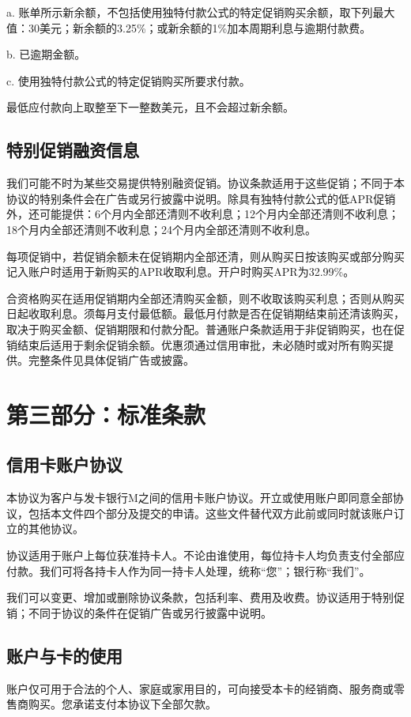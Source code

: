 \documentclass[UTF8,fontset=none,11pt,a4paper]{ctexart}
\begin{document}
a. 账单所示新余额，不包括使用独特付款公式的特定促销购买余额，取下列最大值：30美元；新余额的3.25\%；或新余额的1\%加本周期利息与逾期付款费。


b. 已逾期金额。


c. 使用独特付款公式的特定促销购买所要求付款。


最低应付款向上取整至下一整数美元，且不会超过新余额。


\subsection*{特别促销融资信息}
我们可能不时为某些交易提供特别融资促销。协议条款适用于这些促销；不同于本协议的特别条件会在广告或另行披露中说明。除具有独特付款公式的低APR促销外，还可能提供：6个月内全部还清则不收利息；12个月内全部还清则不收利息；18个月内全部还清则不收利息；24个月内全部还清则不收利息。


每项促销中，若促销余额未在促销期内全部还清，则从购买日按该购买或部分购买记入账户时适用于新购买的APR收取利息。开户时购买APR为32.99\%。


合资格购买在适用促销期内全部还清购买金额，则不收取该购买利息；否则从购买日起收取利息。须每月支付最低额。最低月付款是否在促销期结束前还清该购买，取决于购买金额、促销期限和付款分配。普通账户条款适用于非促销购买，也在促销结束后适用于剩余促销余额。优惠须通过信用审批，未必随时或对所有购买提供。完整条件见具体促销广告或披露。


\section*{第三部分：标准条款}
\subsection*{信用卡账户协议}
本协议为客户与发卡银行M之间的信用卡账户协议。开立或使用账户即同意全部协议，包括本文件四个部分及提交的申请。这些文件替代双方此前或同时就该账户订立的其他协议。


协议适用于账户上每位获准持卡人。不论由谁使用，每位持卡人均负责支付全部应付款。我们可将各持卡人作为同一持卡人处理，统称“您”；银行称“我们”。


我们可以变更、增加或删除协议条款，包括利率、费用及收费。协议适用于特别促销；不同于协议的条件在促销广告或另行披露中说明。


\subsection*{账户与卡的使用}
账户仅可用于合法的个人、家庭或家用目的，可向接受本卡的经销商、服务商或零售商购买。您承诺支付本协议下全部欠款。
\end{document}
